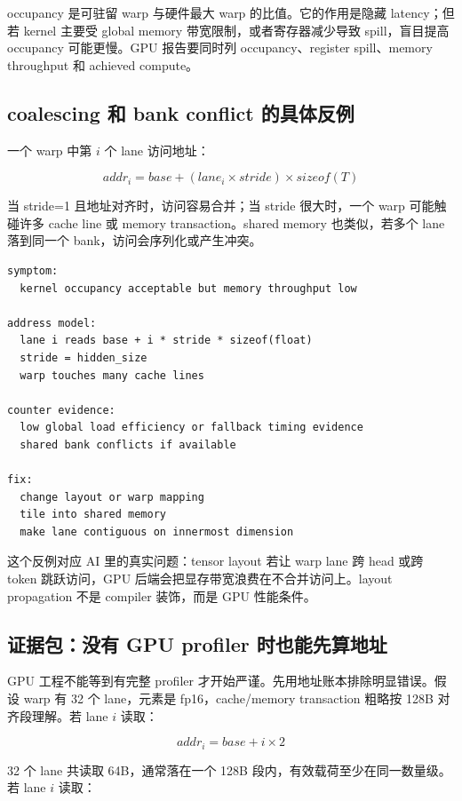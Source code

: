 occupancy 是可驻留 warp 与硬件最大 warp 的比值。它的作用是隐藏 latency；但若 kernel 主要受 global memory 带宽限制，或者寄存器减少导致 spill，盲目提高 occupancy 可能更慢。GPU 报告要同时列 occupancy、register spill、memory throughput 和 achieved compute。

\subsection{coalescing 和 bank conflict 的具体反例}

一个 warp 中第 \(i\) 个 lane 访问地址：

\[
addr_i = base + (lane_i \times stride) \times sizeof(T)
\]

当 stride=1 且地址对齐时，访问容易合并；当 stride 很大时，一个 warp 可能触碰许多 cache line 或 memory transaction。shared memory 也类似，若多个 lane 落到同一个 bank，访问会序列化或产生冲突。

\begin{lstlisting}[numbers=none,caption={GPU 访存事故复盘字段}]
symptom:
  kernel occupancy acceptable but memory throughput low

address model:
  lane i reads base + i * stride * sizeof(float)
  stride = hidden_size
  warp touches many cache lines

counter evidence:
  low global load efficiency or fallback timing evidence
  shared bank conflicts if available

fix:
  change layout or warp mapping
  tile into shared memory
  make lane contiguous on innermost dimension
\end{lstlisting}

这个反例对应 AI 里的真实问题：tensor layout 若让 warp lane 跨 head 或跨 token 跳跃访问，GPU 后端会把显存带宽浪费在不合并访问上。layout propagation 不是 compiler 装饰，而是 GPU 性能条件。

\subsection{证据包：没有 GPU profiler 时也能先算地址}

GPU 工程不能等到有完整 profiler 才开始严谨。先用地址账本排除明显错误。假设 warp 有 32 个 lane，元素是 fp16，cache/memory transaction 粗略按 128B 对齐段理解。若 lane \(i\) 读取：

\[
addr_i = base + i \times 2
\]

32 个 lane 共读取 64B，通常落在一个 128B 段内，有效载荷至少在同一数量级。若 lane \(i\) 读取：

